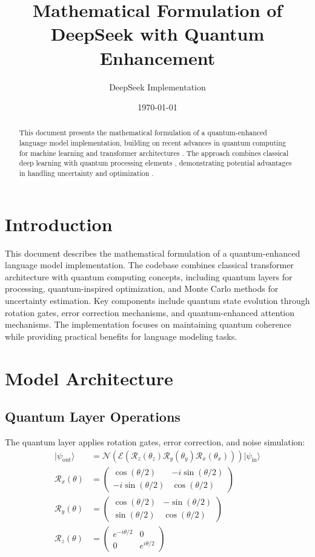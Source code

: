 \documentclass{article}
\title{Mathematical Formulation of DeepSeek with Quantum Enhancement}
\author{DeepSeek Implementation}
\date{\today}
\begin{document}
\maketitle

\begin{abstract}
This document presents the mathematical formulation of a quantum-enhanced language model implementation, building on recent advances in quantum computing for machine learning \citep{bharti2022noisy} and transformer architectures \citep{vaswani2017attention}. The approach combines classical deep learning with quantum processing elements \citep{schuld2019quantum}, demonstrating potential advantages in handling uncertainty \citep{gal2016dropout} and optimization \citep{farhi2018classification}.
\end{abstract}

\section*{Introduction}
This document describes the mathematical formulation of a quantum-enhanced language model implementation. The codebase combines classical transformer architecture with quantum computing concepts, including quantum layers for processing, quantum-inspired optimization, and Monte Carlo methods for uncertainty estimation. Key components include quantum state evolution through rotation gates, error correction mechanisms, and quantum-enhanced attention mechanisms. The implementation focuses on maintaining quantum coherence while providing practical benefits for language modeling tasks.

\section{Model Architecture}

\subsection{Quantum Layer Operations}
The quantum layer applies rotation gates, error correction, and noise simulation:
\begin{align*}
|\psi_{\text{out}}\rangle &= \mathcal{N}(\mathcal{E}(\mathcal{R}_z(\theta_z)\mathcal{R}_y(\theta_y)\mathcal{R}_x(\theta_x)))|\psi_{\text{in}}\rangle \\
\mathcal{R}_x(\theta) &= \begin{pmatrix} \cos(\theta/2) & -i\sin(\theta/2) \\ -i\sin(\theta/2) & \cos(\theta/2) \end{pmatrix} \\
\mathcal{R}_y(\theta) &= \begin{pmatrix} \cos(\theta/2) & -\sin(\theta/2) \\ \sin(\theta/2) & \cos(\theta/2) \end{pmatrix} \\
\mathcal{R}_z(\theta) &= \begin{pmatrix} e^{-i\theta/2} & 0 \\ 0 & e^{i\theta/2} \end{pmatrix}
\end{align*}
\end{document}
